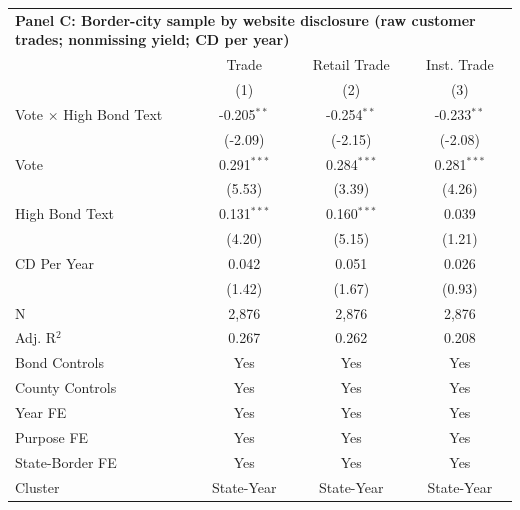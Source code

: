 \begingroup
\centering
\begin{tabular*}{\textwidth}{@{\extracolsep{\fill}}lccc}
\multicolumn{5}{l}{\textbf{Panel C: Border-city sample by website disclosure (raw customer trades; nonmissing yield; CD per year)}}\\

\addlinespace
   \toprule
                                 & Trade         & Retail Trade  & Inst. Trade\\  
                                 & (1)           & (2)           & (3)\\  
   \midrule 
   Vote $\times$ High Bond Text  & -0.205$^{**}$ & -0.254$^{**}$ & -0.233$^{**}$\\   
                                 & (-2.09)      & (-2.15)      & (-2.08)\\   
   Vote                          & 0.291$^{***}$ & 0.284$^{***}$ & 0.281$^{***}$\\   
                                 & (5.53)       & (3.39)       & (4.26)\\   
   High Bond Text                & 0.131$^{***}$ & 0.160$^{***}$ & 0.039\\   
                                 & (4.20)       & (5.15)       & (1.21)\\   
   CD Per Year                   & 0.042         & 0.051         & 0.026\\   
                                 & (1.42)       & (1.67)       & (0.93)\\   
   \hline
   N                  & 2,876         & 2,876         & 2,876\\  
   Adj. R$^2$                & 0.267         & 0.262         & 0.208\\  
   Bond Controls                 & Yes           & Yes           & Yes\\  
   County Controls               & Yes           & Yes           & Yes\\  
   Year FE                       & Yes           & Yes           & Yes\\  
   Purpose FE                    & Yes           & Yes           & Yes\\  
   State-Border FE               & Yes           & Yes           & Yes\\  
   Cluster              & State-Year & State-Year & State-Year\\  
   \bottomrule
\end{tabular*}
\par\endgroup
